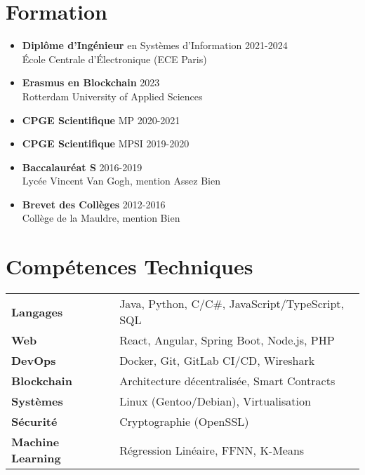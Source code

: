 \documentclass[11pt, a4paper]{article}
\begin{document}
\section*{Formation}
\begin{itemize}
    \item \textbf{Diplôme d'Ingénieur} en Systèmes d'Information \hfill 2021-2024\\
          École Centrale d'Électronique (ECE Paris)

    \item \textbf{Erasmus en Blockchain} \hfill 2023\\
          Rotterdam University of Applied Sciences

    \item \textbf{CPGE Scientifique} MP \hfill 2020-2021

    \item \textbf{CPGE Scientifique} MPSI \hfill 2019-2020

    \item \textbf{Baccalauréat S} \hfill 2016-2019\\
          Lycée Vincent Van Gogh, mention Assez Bien

    \item \textbf{Brevet des Collèges} \hfill 2012-2016\\
          Collège de la Mauldre, mention Bien
\end{itemize}

\section*{Compétences Techniques}
\begin{tabular}{@{}ll@{}}
    \textbf{Langages} & Java, Python, C/C\#, JavaScript/TypeScript, SQL \\
    \textbf{Web} & React, Angular, Spring Boot, Node.js, PHP \\
    \textbf{DevOps} & Docker, Git, GitLab CI/CD, Wireshark \\
    \textbf{Blockchain} & Architecture décentralisée, Smart Contracts \\
    \textbf{Systèmes} & Linux (Gentoo/Debian), Virtualisation \\
    \textbf{Sécurité} & Cryptographie (OpenSSL) \\
    \textbf{Machine Learning} & Régression Linéaire, FFNN, K-Means \\
\end{tabular}
\end{document}
